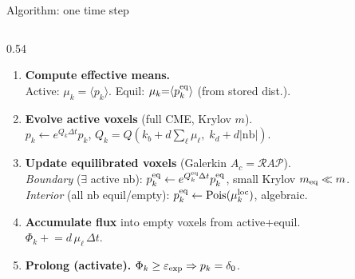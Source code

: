 \documentclass[10pt,aspectratio=169]{beamer}
\newcommand{\Pois}{\operatorname{Pois}}
\newcommand{\calR}{\mathcal{R}}
\newcommand{\calP}{\mathcal{P}}
\begin{document}
\begin{frame}[shrink=4]{Algorithm: one time step}

\vspace{-0.1cm}
\begin{columns}[T]
  \begin{column}{0.54\textwidth}
    \begin{enumerate}\setlength\itemsep{0.28em}
      \item \textbf{Compute effective means.}\\
            Active: $\mu_k {=} \langle p_k \rangle$.
            Equil: $\mu_k {=} \langle p_k^{\rm eq} \rangle$ (from stored dist.).

      \item \textbf{Evolve active voxels} (full CME, Krylov $m$).\\
            $p_k \leftarrow e^{Q_k \Delta t} p_k$,\;
            $Q_k = Q(k_b {+} d\sum_{\ell} \mu_\ell,\; k_d {+} d|\text{nb}|)$.

      \item \textbf{Update equilibrated voxels} (Galerkin $A_c{=}\calR A\calP$).\\
            \textcolor{equilcolor!80!black}{\textit{Boundary}} ($\exists$ active nb):
            $p_k^{\rm eq} \leftarrow e^{Q_k^{\rm eq}\Delta t}p_k^{\rm eq}$,
            small Krylov $m_{\rm eq} \ll m$.\\
            \textcolor{equilcolor!50}{\textit{Interior}} (all nb equil/empty):
            $p_k^{\rm eq} \leftarrow \Pois(\mu_k^{\rm loc})$, algebraic.

      \item \textbf{Accumulate flux} into empty voxels from active+equil.\\
            $\Phi_k \mathrel{+}= d\,\mu_\ell\,\Delta t$.

      \item \textbf{Prolong (activate).}
            $\Phi_k \ge \varepsilon_{\rm exp} \Rightarrow p_k = \delta_0$.


\end{enumerate}
\end{column}
\end{columns}
\end{frame}
\end{document}
